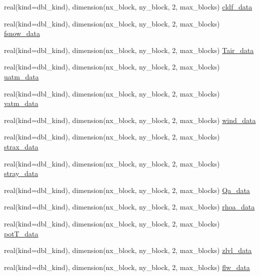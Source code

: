 \begin{DoxyCompactItemize}
\item 
real(kind=dbl\_\-kind), dimension(nx\_\-block, ny\_\-block, 2, max\_\-blocks) \hyperlink{namespaceice__forcing_aa497c4b2e2bdd7e83e0b08b306c364c8}{cldf\_\-data}
\item 
real(kind=dbl\_\-kind), dimension(nx\_\-block, ny\_\-block, 2, max\_\-blocks) \hyperlink{namespaceice__forcing_ae97592cfaa6f6f1dfe5a12391e7f912d}{fsnow\_\-data}
\item 
real(kind=dbl\_\-kind), dimension(nx\_\-block, ny\_\-block, 2, max\_\-blocks) \hyperlink{namespaceice__forcing_ad7ad20c7d13ff53a459e4f18b8eeccbf}{Tair\_\-data}
\item 
real(kind=dbl\_\-kind), dimension(nx\_\-block, ny\_\-block, 2, max\_\-blocks) \hyperlink{namespaceice__forcing_a3e020efe327d9945b65433fa30d543ef}{uatm\_\-data}
\item 
real(kind=dbl\_\-kind), dimension(nx\_\-block, ny\_\-block, 2, max\_\-blocks) \hyperlink{namespaceice__forcing_a369b83c4f0776d66c624871fbb32767d}{vatm\_\-data}
\item 
real(kind=dbl\_\-kind), dimension(nx\_\-block, ny\_\-block, 2, max\_\-blocks) \hyperlink{namespaceice__forcing_a5b562d2a30773faba85cbae322e64162}{wind\_\-data}
\item 
real(kind=dbl\_\-kind), dimension(nx\_\-block, ny\_\-block, 2, max\_\-blocks) \hyperlink{namespaceice__forcing_a553d40f9acc76f1b6dc8fc56cddccf87}{strax\_\-data}
\item 
real(kind=dbl\_\-kind), dimension(nx\_\-block, ny\_\-block, 2, max\_\-blocks) \hyperlink{namespaceice__forcing_af5d69277a6de176e90f0b2329fef928c}{stray\_\-data}
\item 
real(kind=dbl\_\-kind), dimension(nx\_\-block, ny\_\-block, 2, max\_\-blocks) \hyperlink{namespaceice__forcing_aa702ee11143b22380ab015e34da2cd55}{Qa\_\-data}
\item 
real(kind=dbl\_\-kind), dimension(nx\_\-block, ny\_\-block, 2, max\_\-blocks) \hyperlink{namespaceice__forcing_ab950a2df7e588896b30862fc06c54496}{rhoa\_\-data}
\item 
real(kind=dbl\_\-kind), dimension(nx\_\-block, ny\_\-block, 2, max\_\-blocks) \hyperlink{namespaceice__forcing_a8be75ef0261c9c45a8a2b4983813d2ea}{potT\_\-data}
\item 
real(kind=dbl\_\-kind), dimension(nx\_\-block, ny\_\-block, 2, max\_\-blocks) \hyperlink{namespaceice__forcing_ad17a564b4d1aff388f9e96432340e0f8}{zlvl\_\-data}
\item 
real(kind=dbl\_\-kind), dimension(nx\_\-block, ny\_\-block, 2, max\_\-blocks) \hyperlink{namespaceice__forcing_a22c2a2d054007cbf4c83142fba90a332}{flw\_\-data}

\end{DoxyCompactItemize}
